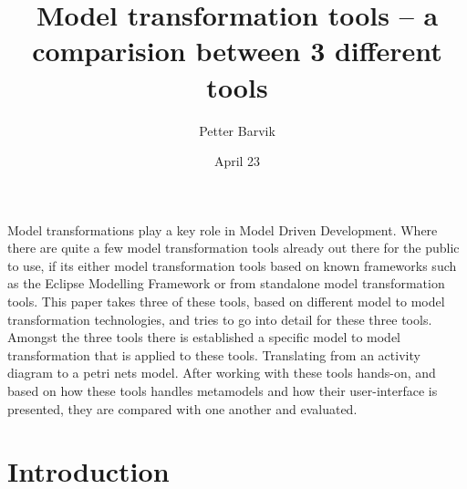 \documentclass[pdftex,11pt,a4paper]{article}
\begin{document}
\title{Model transformation tools -- a comparision between 3 different tools}
\date{April 23}
\author{Petter Barvik}

\maketitle

\abstract{}
\noindent Model transformations play a key role in Model Driven Development.
Where there are quite a few model transformation tools already out there for
the public to use, if its either model transformation tools based on known
frameworks such as the Eclipse Modelling Framework or from standalone model
transformation tools. This paper takes three of these tools, based on
different model to model transformation technologies, and tries to go into
detail for these three tools. Amongst the three tools there is established a
specific model to model transformation that is applied to these tools.
Translating from an activity diagram to a petri nets model. After working with
these tools hands-on, and based on how these tools handles metamodels and how
their user-interface is presented, they are compared with one another and
evaluated.

\newpage
\section{Introduction}
\end{document}
